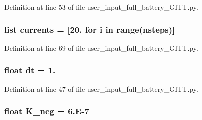 Definition at line 53 of file user\-\_\-input\-\_\-full\-\_\-battery\-\_\-\-G\-I\-T\-T.\-py.

\hypertarget{namespaceuser__input__full__battery___g_i_t_t_a216022bdba987f127b6cc081ee78e2bd}{
\subsubsection[{currents}]{\setlength{\rightskip}{0pt plus 5cm}list currents = \mbox{[}20. for i in range({\bf nsteps})\mbox{]}}}\label{namespaceuser__input__full__battery___g_i_t_t_a216022bdba987f127b6cc081ee78e2bd}


Definition at line 69 of file user\-\_\-input\-\_\-full\-\_\-battery\-\_\-\-G\-I\-T\-T.\-py.

\hypertarget{namespaceuser__input__full__battery___g_i_t_t_a778e38aa889751afffa2dea6b803e67a}{
\subsubsection[{dt}]{\setlength{\rightskip}{0pt plus 5cm}float dt = 1.}}\label{namespaceuser__input__full__battery___g_i_t_t_a778e38aa889751afffa2dea6b803e67a}


Definition at line 47 of file user\-\_\-input\-\_\-full\-\_\-battery\-\_\-\-G\-I\-T\-T.\-py.

\hypertarget{namespaceuser__input__full__battery___g_i_t_t_a64d0c5854299798787675bc91586023c}{
\subsubsection[{K\-\_\-neg}]{\setlength{\rightskip}{0pt plus 5cm}float K\-\_\-neg = 6.\-E-\/7}}\label{namespaceuser__input__full__battery___g_i_t_t_a64d0c5854299798787675bc91586023c}


